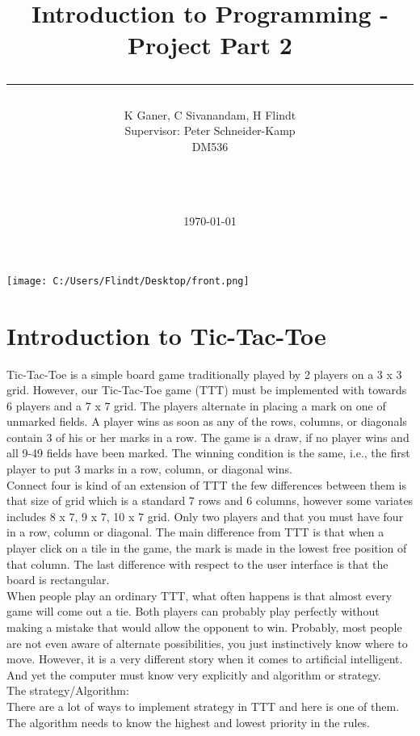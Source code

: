 \documentclass[a4paper,10pt]{article}
\title{Introduction to Programming - Project Part 2 \\\rule{10cm}{0.5mm}}
\author{K Ganer, C Sivanandam, H Flindt 
	\\Supervisor: Peter Schneider-Kamp\\ DM536\\\rule{5.5cm}{0.5mm}\\}
\date{\today}
\begin{document}
	
	\maketitle
\vspace{20mm}
	
\centerline{\texttt{[image: C:/Users/Flindt/Desktop/front.png]}}


	\newpage
	\tableofcontents
	
	\newpage
	
	\section{Introduction to Tic-Tac-Toe}
Tic-Tac-Toe is a simple board game traditionally played by 2 players on a 3 x 3 grid. However, our Tic-Tac-Toe game (TTT) must be implemented with towards 6 players and a 7 x 7 grid. The players alternate in placing a mark on one of unmarked fields. A player wins as soon as any of the rows, columns, or diagonals contain 3 of his or her marks in a row. The game is a draw, if no player wins and all 9-49 fields have been marked. The winning condition is the same, i.e., the first player to put 3 marks in a row, column, or diagonal wins.\\ 
Connect four is kind of an extension of TTT the few differences between them is that size of grid which is a  standard 7 rows and 6 columns, however some variates includes 8 x 7, 9 x 7, 10 x 7 grid. Only two players and that you must have four in a row, column or diagonal. The main difference from TTT is that when a player click on a tile in the game, the mark is made in the lowest free position of that column. The last difference with respect to the user interface is that the board is rectangular.\\
When people play an ordinary TTT, what often happens is that almost every game will come out a tie. Both players can probably play perfectly without making a mistake that would allow the opponent to win. Probably, most people are not even aware of alternate possibilities, you just instinctively know where to move. However, it is a very different story when it comes to artificial intelligent. And yet the computer must know very explicitly and algorithm or strategy.\\
The strategy/Algorithm:\\
There are a lot of ways to implement strategy in TTT and here is one of them. The algorithm needs to know the highest and lowest priority in the rules.\\ 
\end{document}
